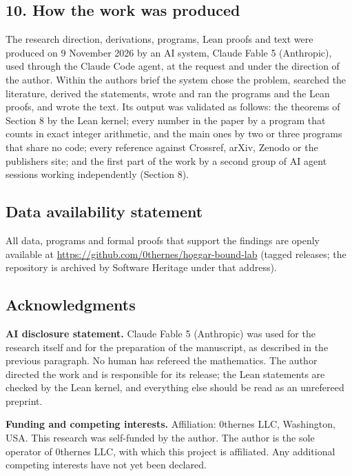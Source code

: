 \documentclass[11pt,a4paper]{article}
\begin{document}
\subsection{10. How the work was produced}\label{10-how-the-work-was-produced}

The research direction, derivations, programs, Lean proofs and text were
produced on 9 November 2026 by an AI system, Claude Fable 5 (Anthropic), used through the Claude Code
agent, at the request and under the direction of the author. Within the author\textquotesingle s brief the system
chose the problem, searched the literature, derived the statements, wrote and ran the programs and the
Lean proofs, and wrote the text. Its output was validated as follows: the theorems of Section 8 by the
Lean kernel; every number in the paper by a program that counts in exact integer arithmetic, and the
main ones by two or three programs that share no code; every reference against Crossref, arXiv, Zenodo
or the publisher\textquotesingle s site; and the first part of the work by a second group of AI agent sessions working
independently (Section 8).

\subsection{Data availability statement}\label{data-availability-statement}

All data, programs and formal proofs that support the findings are
openly available at \url{https://github.com/0thernes/hoggar-bound-lab} (tagged releases; the repository is
archived by Software Heritage under that address).

\subsection{Acknowledgments}\label{acknowledgments}

\textbf{AI disclosure statement.} Claude Fable 5 (Anthropic) was used for the research itself and for the
preparation of the manuscript, as described in the previous paragraph. No human has refereed the
mathematics. The author directed the work and is responsible for its release; the Lean statements are
checked by the Lean kernel, and everything else should be read as an unrefereed preprint.

\textbf{Funding and competing interests.} Affiliation: 0thernes LLC, Washington, USA. This research was
self-funded by the author. The author is the sole operator of 0thernes LLC, with which this project is
affiliated. Any additional competing interests have not yet been declared.
\end{document}
